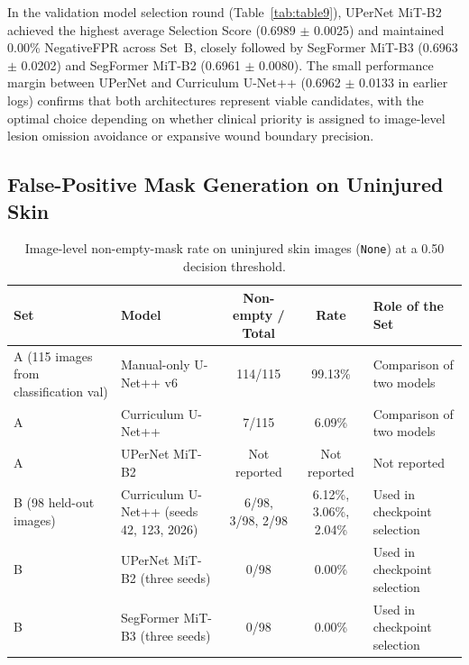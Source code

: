 \documentclass[11pt,a4paper]{article}
\begin{document}
In the validation model selection round (Table~\ref{tab:table9}), UPerNet MiT-B2 achieved the highest average Selection Score (0.6989 $\pm$ 0.0025) and maintained 0.00\% NegativeFPR across Set~B, closely followed by SegFormer MiT-B3 (0.6963 $\pm$ 0.0202) and SegFormer MiT-B2 (0.6961 $\pm$ 0.0080). The small performance margin between UPerNet and Curriculum U-Net++ (0.6962 $\pm$ 0.0133 in earlier logs) confirms that both architectures represent viable candidates, with the optimal choice depending on whether clinical priority is assigned to image-level lesion omission avoidance or expansive wound boundary precision.

\subsection{False-Positive Mask Generation on Uninjured Skin}

\begin{table}[H]
\centering
\caption{Image-level non-empty-mask rate on uninjured skin images (\texttt{None}) at a 0.50 decision threshold.}
\label{tab:table10}
\small
\begin{tabularx}{\textwidth}{>{\raggedright\arraybackslash}p{2.2cm} >{\raggedright\arraybackslash}p{2.6cm} c c X}
\textbf{Set} & \textbf{Model} & \textbf{Non-empty / Total} & \textbf{Rate} & \textbf{Role of the Set} \\
\midrule
A (115 images from classification val) & Manual-only U-Net++ v6       & 114/115 & 99.13\% & Comparison of two models \\
A & Curriculum U-Net++           & 7/115   & 6.09\%  & Comparison of two models \\
A & UPerNet MiT-B2               & Not reported & Not reported & Not reported \\
\midrule
B (98 held-out images) & Curriculum U-Net++ (seeds 42, 123, 2026) & 6/98, 3/98, 2/98 & 6.12\%, 3.06\%, 2.04\% & Used in checkpoint selection \\
B & UPerNet MiT-B2 (three seeds) & 0/98    & 0.00\%  & Used in checkpoint selection \\
B & SegFormer MiT-B3 (three seeds)& 0/98   & 0.00\%  & Used in checkpoint selection \\
\bottomrule
\end{tabularx}
\end{table}
\end{document}
